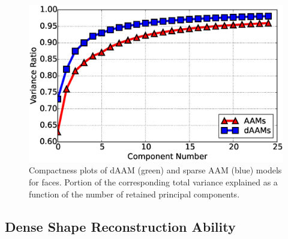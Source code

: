 \begin{figure}[!t]
    \centering
    \includegraphics[width=\columnwidth]{Suplementory_Meterial/Model_Analysis/cumu_var_ratio}
    \caption{Compactness plots of dAAM (green) and sparse AAM (blue) models for faces. Portion of the corresponding total variance explained as a function of the number of retained principal components.}
    \label{fig:compact}
\end{figure}

\subsection{Dense Shape Reconstruction Ability}

